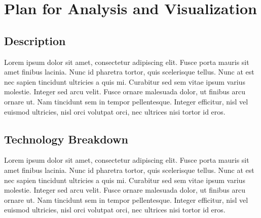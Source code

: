 \documentclass{article}
\begin{document}
\citet{kagglekernal}

\section{Plan for Analysis and
Visualization}\label{plan-for-analysis-and-visualization}

\subsection{Description}\label{description}

Lorem ipsum dolor sit amet, consectetur adipiscing elit. Fusce porta
mauris sit amet finibus lacinia. Nunc id pharetra tortor, quis
scelerisque tellus. Nunc at est nec sapien tincidunt ultricies a quis
mi. Curabitur sed sem vitae ipsum varius molestie. Integer sed arcu
velit. Fusce ornare malesuada dolor, ut finibus arcu ornare ut. Nam
tincidunt sem in tempor pellentesque. Integer efficitur, nisl vel
euismod ultricies, nisl orci volutpat orci, nec ultrices nisi tortor id
eros.

\subsection{Technology Breakdown}\label{technology-breakdown}

Lorem ipsum dolor sit amet, consectetur adipiscing elit. Fusce porta
mauris sit amet finibus lacinia. Nunc id pharetra tortor, quis
scelerisque tellus. Nunc at est nec sapien tincidunt ultricies a quis
mi. Curabitur sed sem vitae ipsum varius molestie. Integer sed arcu
velit. Fusce ornare malesuada dolor, ut finibus arcu ornare ut. Nam
tincidunt sem in tempor pellentesque. Integer efficitur, nisl vel
euismod ultricies, nisl orci volutpat orci, nec ultrices nisi tortor id
eros.



\end{document}
